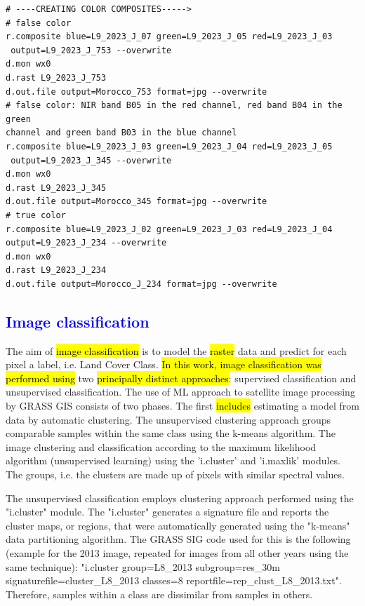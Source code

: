 \documentclass[geomatics,article,submit,pdftex,moreauthors]{Definitions/mdpi}
\begin{document}
\begin{footnotesize}
\begin{verbatim}
# ----CREATING COLOR COMPOSITES----->
# false color
r.composite blue=L9_2023_J_07 green=L9_2023_J_05 red=L9_2023_J_03
 output=L9_2023_J_753 --overwrite
d.mon wx0
d.rast L9_2023_J_753
d.out.file output=Morocco_753 format=jpg --overwrite
# false color: NIR band B05 in the red channel, red band B04 in the green 
channel and green band B03 in the blue channel
r.composite blue=L9_2023_J_03 green=L9_2023_J_04 red=L9_2023_J_05
 output=L9_2023_J_345 --overwrite
d.mon wx0
d.rast L9_2023_J_345
d.out.file output=Morocco_345 format=jpg --overwrite
# true color
r.composite blue=L9_2023_J_02 green=L9_2023_J_03 red=L9_2023_J_04
output=L9_2023_J_234 --overwrite
d.mon wx0
d.rast L9_2023_J_234
d.out.file output=Morocco_J_234 format=jpg --overwrite
\end{verbatim}
\end{footnotesize}

\subsection{\textcolor{blue}{Image classification}}
The aim of \hl{image classification} is to model the \hl{raster }data and predict for each pixel a label, i.e. Land Cover Class. \hl{In this work, image classification was performed using} two \hl{principally distinct approaches}: supervised classification and unsupervised classification. The use of ML approach to satellite image processing by GRASS GIS consists of two phases. The first \hl{includes} estimating a model from data by automatic clustering. The unsupervised clustering approach groups comparable samples within the same class using the k-means algorithm. The image clustering and classification according to the maximum likelihood algorithm (unsupervised learning) using the 'i.cluster' and 'i.maxlik' modules. The groups, i.e. the clusters are made up of pixels with similar spectral values. 

The unsupervised classification employs clustering approach performed using the "i.cluster" module. The "i.cluster" generates a signature file and reports the cluster maps, or regions, that were automatically generated using the "k-means" data partitioning algorithm. The GRASS SIG code used for this is the following (example for the 2013 image, repeated for images from all other years using the same technique): "i.cluster group=L8\_2013 subgroup=res\_30m signaturefile=cluster\_L8\_2013 classes=8 reportfile=rep\_clust\_L8\_2013.txt". Therefore, samples within a class are dissimilar from samples in others.
\end{document}
